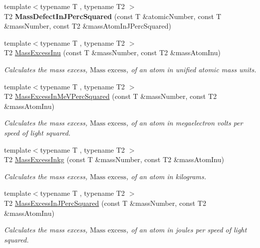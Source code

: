 \begin{DoxyCompactItemize}
\item 
{\footnotesize template$<$typename T , typename T2 $>$ }\\T2 {\bfseries Mass\+Defect\+In\+J\+Perc\+Squared} (const T \&atomic\+Number, const T \&mass\+Number, const T2 \&mass\+Atom\+In\+J\+Perc\+Squared)
\item 
{\footnotesize template$<$typename T , typename T2 $>$ }\\T2 \hyperlink{group___mass_excess_ga61c6f557bd742126c0c76e88cf7740ad}{Mass\+Excess\+Inu} (const T \&mass\+Number, const T2 \&mass\+Atom\+Inu)
\begin{DoxyCompactList}\small\item\em Calculates the mass excess, $\text{Mass excess}$, of an atom in unified atomic mass units. \end{DoxyCompactList}\item 
{\footnotesize template$<$typename T , typename T2 $>$ }\\T2 \hyperlink{group___mass_excess_ga99a93b88df3425b7a153c32c05fa5a88}{Mass\+Excess\+In\+Me\+V\+Perc\+Squared} (const T \&mass\+Number, const T2 \&mass\+Atom\+Inu)
\begin{DoxyCompactList}\small\item\em Calculates the mass excess, $\text{Mass excess}$, of an atom in megaelectron volts per speed of light squared. \end{DoxyCompactList}\item 
{\footnotesize template$<$typename T , typename T2 $>$ }\\T2 \hyperlink{group___mass_excess_gab72a3640886092be8b9c9662020a2306}{Mass\+Excess\+Inkg} (const T \&mass\+Number, const T2 \&mass\+Atom\+Inu)
\begin{DoxyCompactList}\small\item\em Calculates the mass excess, $\text{Mass excess}$, of an atom in kilograms. \end{DoxyCompactList}\item 
{\footnotesize template$<$typename T , typename T2 $>$ }\\T2 \hyperlink{group___mass_excess_ga3eb487f438543e950b9c5aece4c5b409}{Mass\+Excess\+In\+J\+Perc\+Squared} (const T \&mass\+Number, const T2 \&mass\+Atom\+Inu)
\begin{DoxyCompactList}\small\item\em Calculates the mass excess, $\text{Mass excess}$, of an atom in joules per speed of light squared. \end{DoxyCompactList}\item 

\end{DoxyCompactItemize}
